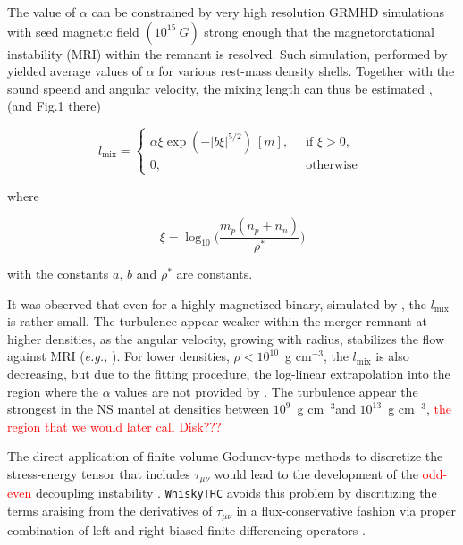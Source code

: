 \documentclass[11pt,a4paper,headinclude=true,DIV=14,BCOR=8mm,chapterprefix,listof=totoc,twoside,openright,abstracton]{scrbook}
\newcommand{\red}[1]{\textcolor{red}{#1}}
\newcommand{\gcm}{g cm$^{-3}$}
\begin{document}
The value of $\alpha$ can be constrained by very high resolution GRMHD simulations with seed magnetic field $(10^{15}~G)$ strong enough that the magnetorotational instability (MRI) within the remnant is resolved. 
Such simulation, performed by \cite{Kiuchi:2017zzg} yielded average values of $\alpha$ for various rest-mass density shells.
Together with the sound speend and angular velocity, the mixing length can thus be estimated \cite{Radice:2020ids}, (and Fig.1 there) 

\begin{equation}
l_{\text{mix}} = 
\begin{cases}
\alpha \xi \exp(-|b\xi|^{5/2}) \: [m], \: &\text{ if } \xi > 0, \\
0, &\text{ otherwise }
\end{cases}
\end{equation}

where 

\begin{equation}
\xi = \log_{10}\Big( \frac{m_p(n_p + n_n)}{\rho^*} \Big)
\end{equation}

with the constants $a$, $b$ and $\rho^*$ are constants.

It was observed that even for a highly magnetized binary, simulated by \cite{Kiuchi:2017zzg}, the $l_{\text{mix}}$ is rather small. The turbulence appear weaker within the merger remnant at higher densities, as the angular velocity, growing with radius, stabilizes the flow against MRI (\textit{e.g.,} \cite{Radice:2017lry}). 
For lower densities, $\rho<10^{10}$~\gcm, the $l_{\text{mix}}$ is also decreasing, but due to the fitting procedure, the log-linear extrapolation into the region where the $\alpha$ values are not provided by \cite{Kiuchi:2017zzg}.
The turbulence appear the strongest in the NS mantel at densities between $10^{9}$~\gcm and $10^{13}$~\gcm,
\red{the region that we would later call Disk???}




The direct application of finite volume Godunov-type methods to discretize the stress-energy tensor 
that includes $\tau_{\mu\nu}$ would lead to the development of the \red{odd-even} decoupling instability \cite{Lowrie:2002}.
\texttt{WhiskyTHC} avoids this problem by discritizing the terms araising from the derivatives of $\tau_{\mu\nu}$
in a flux-conservative fashion via proper combination of left and right biased finite-differencing operators \cite{Radice:2018pdn}.
\end{document}
